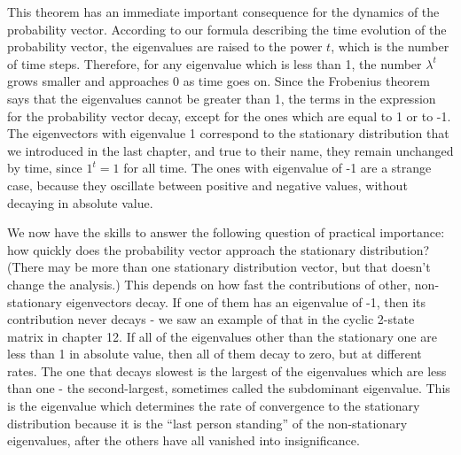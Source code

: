 \documentclass[
]{book}
\theoremstyle{definition}
\theoremstyle{definition}
\theoremstyle{definition}
\theoremstyle{remark}
\begin{document}
This theorem has an immediate important consequence for the dynamics of the probability vector. According to our formula describing the time evolution of the probability vector, the eigenvalues are raised to the power \(t\), which is the number of time steps. Therefore, for any eigenvalue which is less than 1, the number \(\lambda^t\) grows smaller and approaches 0 as time goes on. Since the Frobenius theorem says that the eigenvalues cannot be greater than 1, the terms in the expression for the probability vector decay, except for the ones which are equal to 1 or to -1. The eigenvectors with eigenvalue 1 correspond to the stationary distribution that we introduced in the last chapter, and true to their name, they remain unchanged by time, since \(1^t =1\) for all time. The ones with eigenvalue of -1 are a strange case, because they oscillate between positive and negative values, without decaying in absolute value.

We now have the skills to answer the following question of practical importance: how quickly does the probability vector approach the stationary distribution? (There may be more than one stationary distribution vector, but that doesn't change the analysis.) This depends on how fast the contributions of other, non-stationary eigenvectors decay. If one of them has an eigenvalue of -1, then its contribution never decays - we saw an example of that in the cyclic 2-state matrix in chapter 12. If all of the eigenvalues other than the stationary one are less than 1 in absolute value, then all of them decay to zero, but at different rates. The one that decays slowest is the largest of the eigenvalues which are less than one - the second-largest, sometimes called the subdominant eigenvalue. This is the eigenvalue which determines the rate of convergence to the stationary distribution because it is the ``last person standing'' of the non-stationary eigenvalues, after the others have all vanished into insignificance.
\end{document}
